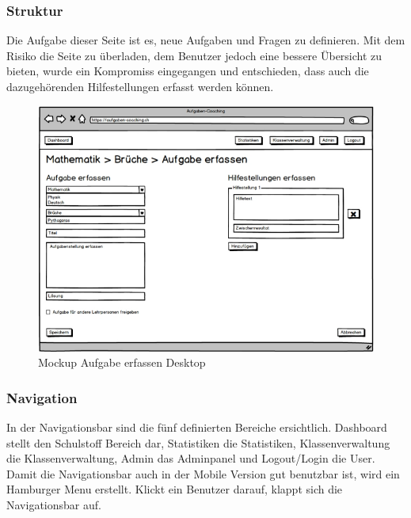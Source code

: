 \subsubsection*{Struktur}
Die Aufgabe dieser Seite ist es, neue Aufgaben und Fragen zu definieren. Mit dem Risiko die Seite zu überladen, dem Benutzer jedoch eine bessere Übersicht zu bieten, wurde ein Kompromiss eingegangen und entschieden, dass auch die dazugehörenden Hilfestellungen erfasst werden können. \\

\begin{minipage}{\textwidth}
	\begin{figure}[H]
	\centering
		\includegraphics[width=\textwidth, keepaspectratio]{images/Mockups/AufgabeErfassen_Desktop.png}
		\caption{Mockup Aufgabe erfassen Desktop}
	\end{figure}
\end{minipage}


\subsubsection*{Navigation}
In der Navigationsbar sind die fünf definierten Bereiche ersichtlich. Dashboard stellt den Schulstoff Bereich dar, Statistiken die Statistiken, Klassenverwaltung die Klassenverwaltung, Admin das Adminpanel und Logout/Login die User. \\

Damit die Navigationsbar auch in der Mobile Version gut benutzbar ist, wird ein Hamburger Menu erstellt. Klickt ein Benutzer darauf, klappt sich die Navigationsbar auf. \\

